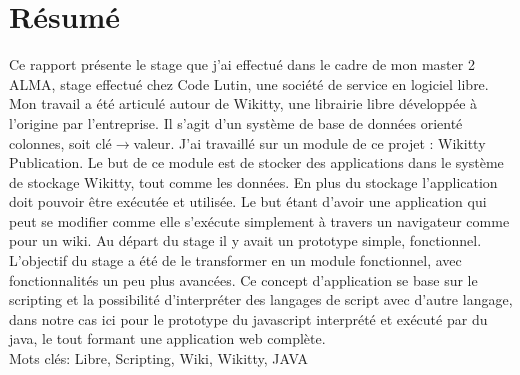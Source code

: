 \section*{Résumé}

Ce rapport présente le stage que j'ai effectué dans le cadre de mon master 2
ALMA, stage effectué chez Code Lutin, une société de service en logiciel libre.
Mon travail a été articulé autour de Wikitty, une librairie libre 
développée à l'origine par l'entreprise. Il s'agit d'un système de base de 
données orienté colonnes, soit clé$\to$valeur. J'ai travaillé sur un module de 
ce projet : Wikitty Publication. Le but de ce module est de stocker des applications
dans le système de stockage Wikitty, tout comme les données. En plus du stockage
l'application doit pouvoir être exécutée et utilisée. Le but étant d'avoir une 
application qui peut se modifier comme elle s'exécute simplement à travers un 
navigateur comme pour un wiki. Au départ du stage il y avait un prototype simple,
fonctionnel. L'objectif du stage a été de le transformer en un module fonctionnel,
avec fonctionnalités un peu plus avancées. Ce concept d'application 
se base sur le scripting et la possibilité d'interpréter des langages de script
avec d'autre langage, dans notre cas ici pour le prototype du javascript
interprété et exécuté par du java, le tout formant une application web complète.\\

Mots clés: Libre, Scripting, Wiki, Wikitty, JAVA




